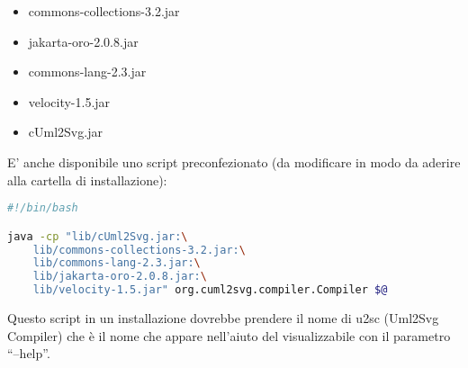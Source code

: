 \begin{itemize}
  \item commons-collections-3.2.jar
  \item jakarta-oro-2.0.8.jar
  \item commons-lang-2.3.jar
  \item velocity-1.5.jar
  \item cUml2Svg.jar
\end{itemize}

E' anche disponibile uno script preconfezionato (da modificare in modo da
aderire alla cartella di installazione):

\begin{lstlisting}[caption={Output dell'help da linea di comando}, style={none},language=sh]
#!/bin/bash

java -cp "lib/cUml2Svg.jar:\
	lib/commons-collections-3.2.jar:\
 	lib/commons-lang-2.3.jar:\
 	lib/jakarta-oro-2.0.8.jar:\
 	lib/velocity-1.5.jar" org.cuml2svg.compiler.Compiler $@
\end{lstlisting}

Questo script in un installazione dovrebbe prendere il nome di u2sc (Uml2Svg
Compiler) che è il nome che appare nell'aiuto del visualizzabile con il
parametro ``--help''.

